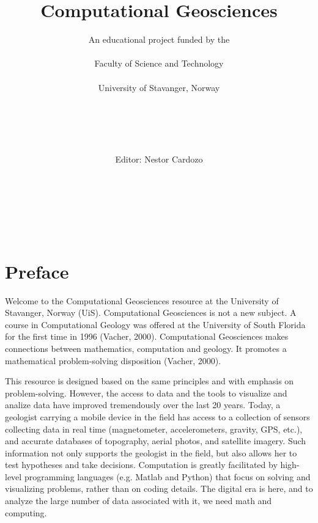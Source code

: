 \documentclass[a4paper , 12pt]{book}
\begin{document}

\lstset{style=mystyle}
\lstset{language=Python,upquote=true} %
\title{Computational Geosciences}
\author{An educational project funded by the \\ \\ Faculty of Science and Technology \\ \\ University of Stavanger, Norway \\ \\ \\ \\ \\ \\ Editor: Nestor Cardozo \\ \\ \\ \\ \\ \\}

\setlength{\parindent}{0pt}
\setlength{\parskip}{1em}
\renewcommand{\baselinestretch}{1.}

\maketitle
{}

\section*{Preface}

Welcome to the Computational Geosciences resource at the University of Stavanger, Norway (UiS). Computational Geosciences is not a new subject. A course in Computational Geology was offered at the University of South Florida for the first time in 1996 (Vacher, 2000). Computational Geosciences makes connections between mathematics, computation and geology. It promotes a mathematical problem-solving disposition (Vacher, 2000). 

This resource is designed based on the same principles and with emphasis on problem-solving. However, the access to data and the tools to visualize and analize data have improved tremendously over the last 20 years. Today, a geologist carrying a mobile device in the field has access to a collection of sensors collecting data in real time (magnetometer, accelerometers, gravity, GPS, etc.), and accurate databases of topography, aerial photos, and satellite imagery. Such information not only supports the geologist in the field, but also allows her to test hypotheses and take decisions. Computation is greatly facilitated by high-level programming languages (e.g. Matlab and Python) that focus on solving and visualizing problems, rather than on coding details. The digital era is here, and to analyze the large number of data associated with it, we need math and computing. 
\end{document}
